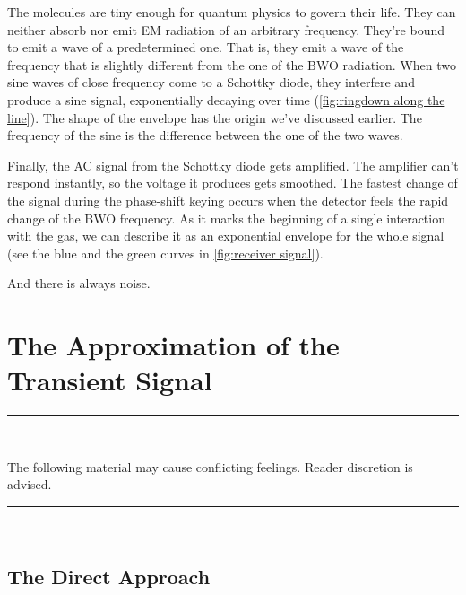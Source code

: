 \documentclass[a4paper]{article}
\begin{document}
The molecules are tiny enough for quantum physics to govern their life. They can neither absorb nor emit EM radiation of an arbitrary frequency. They're bound to emit a wave of a predetermined one. That is, they emit a wave of the frequency that is slightly different from the one of the BWO radiation. When two sine waves of close frequency come to a Schottky diode, they interfere and produce a sine signal, exponentially decaying over time (\cref{fig:ringdown along the line}). The shape of the envelope has the origin we've discussed earlier. The frequency of the sine is the difference between the one of the two waves.

Finally, the AC signal from the Schottky diode gets amplified. The amplifier can't respond instantly, so the voltage it produces gets smoothed. The fastest change of the signal during the phase-shift keying occurs when the detector feels the rapid change of the BWO frequency. As it marks the beginning of a single interaction with the gas, we can describe it as an exponential envelope for the whole signal (see the blue and the green curves in \cref{fig:receiver signal}).

And there is always noise.

\section{The Approximation of the Transient Signal}\label{sec:The Approximation of the Transient Signal}

\begin{minipage}{\linewidth}
	\begin{center}
		\rule{0.75\linewidth}{0.2em}\\[0.5em]

		\begin{minipage}{0.75\linewidth}
			\begin{center}
				The following material may cause conflicting feelings. Reader discretion is advised.
			\end{center}
		\end{minipage}

		\rule{0.75\linewidth}{0.2em}\\[0.5em]
	\end{center}
\end{minipage}

\subsection{The Direct Approach}\label{subsec:The Direct Approach}
\end{document}

